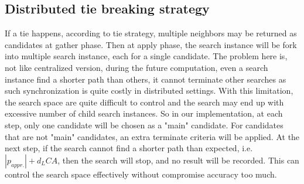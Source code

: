 \subsection{Distributed tie breaking strategy}
If a tie happens, according to tie strategy, multiple neighbors may be returned as candidates at gather phase. Then at apply phase, the search instance will be fork into multiple search instance, each for a single candidate. The problem here is, not like centralized version, during the future computation, even a search instance find a shorter path than others, it cannot terminate other searches as such synchronization is quite costly in distributed settings. With this limitation, the search space are quite difficult to control and the search may end up with excessive number of child search instances. So in our implementation, at each step, only one candidate will be chosen as a "main" candidate. For candidates that are not "main" candidates, an extra terminate criteria will be applied. At the next step, if the search cannot find a shorter path than expected, i.e. $|p_{appr.}| + d_LCA$, then the search will stop, and no result will be recorded. This can control the search space effectively without compromise accuracy too much.

